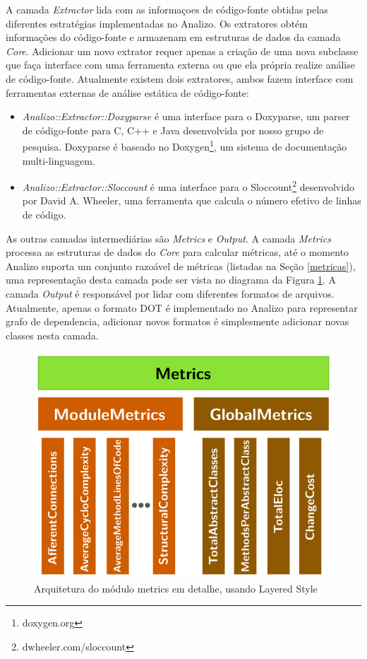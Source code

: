 A camada {\it Extractor} lida com as informaçoes de código-fonte obtidas pelas
diferentes estratégias implementadas no Analizo. Os extratores obtém
informações do código-fonte e armazenam em estruturas de dados da camada {\it
Core}. Adicionar um novo extrator requer apenas a criação de uma nova subclasse
que faça interface com uma ferramenta externa ou que ela própria realize análise
de código-fonte. Atualmente existem dois extratores, ambos fazem interface
com ferramentas externas de análise estática de código-fonte:

\begin{itemize}

  \item {\it Analizo::Extractor::Doxyparse} é uma interface para o Doxyparse,
  um parser de código-fonte para C, C++ e Java desenvolvida por nosso grupo de
  pesquisa\cite{Costa2009}. Doxyparse é baseado no
  Doxygen\footnote{doxygen.org}, um sistema de documentação multi-linguagem.

  \item {\it Analizo::Extractor::Sloccount} é uma interface para o
  Sloccount\footnote{dwheeler.com/sloccount} desenvolvido por David A. Wheeler,
  uma ferramenta que calcula o número efetivo de linhas de código.

\end{itemize}

As outras camadas intermediárias são {\it Metrics} e {\it Output}. A camada
{\it Metrics} processa as estruturas de dados do {\it Core} para calcular
métricas, até o momento Analizo suporta um conjunto razoável de métricas
(listadas na Seção \ref{metricas}), uma representação desta camada pode ser
vista no diagrama da Figura \ref{arquitetura-metrics-analizo}. A camada {\it
Output} é responsável por lidar com diferentes formatos de arquivos.
Atualmente, apenas o formato DOT é implementado no Analizo para representar
grafo de dependencia, adicionar novos formatos é simplesmente adicionar novas
classes nesta camada.

\begin{figure}[H]
\center
\includegraphics[scale=0.4]{imagens/analizo-metrics-architecture.png}
\caption{Arquitetura do módulo metrics em detalhe, usando Layered Style \cite{Clements2002}}
\label{arquitetura-metrics-analizo}
\end{figure}

